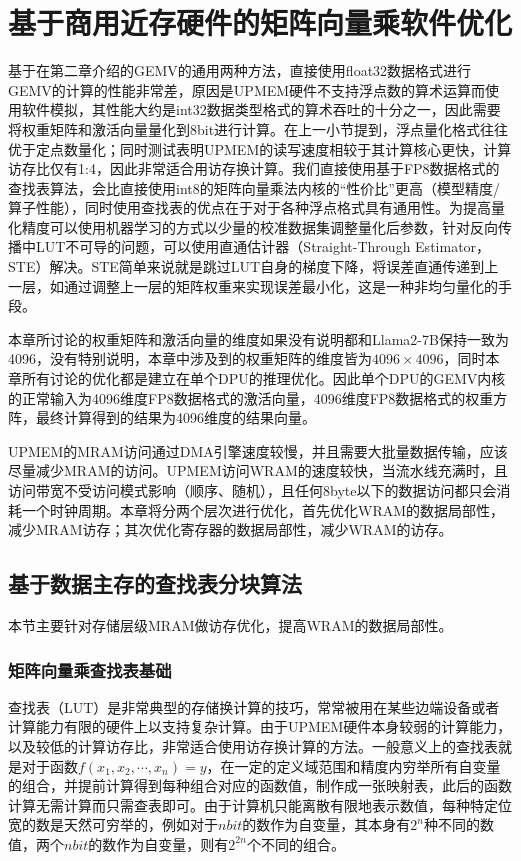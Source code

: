\chapter{基于商用近存硬件的矩阵向量乘软件优化}
基于在第二章介绍的GEMV的通用两种方法，直接使用float32数据格式进行GEMV的计算的性能非常差，原因是UPMEM硬件不支持浮点数的算术运算而使用软件模拟，其性能大约是int32数据类型格式的算术吞吐的十分之一\cite{BenchmarkingMutlu}，因此需要将权重矩阵和激活向量量化到8bit进行计算。在上一小节提到，浮点量化格式往往优于定点数量化\cite{ZeroQuantFP}；同时测试表明UPMEM的读写速度相较于其计算核心更快，计算访存比仅有1:4\cite{BenchmarkingMutlu}，因此非常适合用访存换计算。我们直接使用基于FP8数据格式\cite{FP8}的查找表算法，会比直接使用int8的矩阵向量乘法内核的“性价比”更高（模型精度/算子性能），同时使用查找表的优点在于对于各种浮点格式具有通用性。为提高量化精度可以使用机器学习的方式以少量的校准数据集调整量化后参数，针对反向传播中LUT不可导的问题，可以使用直通估计器（Straight-Through Estimator，STE）解决\cite{NonuniformQuant}。STE简单来说就是跳过LUT自身的梯度下降，将误差直通传递到上一层，如通过调整上一层的矩阵权重来实现误差最小化，这是一种非均匀量化的手段。

本章所讨论的权重矩阵和激活向量的维度如果没有说明都和Llama2-7B保持一致为4096，没有特别说明，本章中涉及到的权重矩阵的维度皆为$4096\times 4096$，同时本章所有讨论的优化都是建立在单个DPU的推理优化。因此单个DPU的GEMV内核的正常输入为4096维度FP8数据格式的激活向量，4096维度FP8数据格式的权重方阵，最终计算得到的结果为4096维度的结果向量。

UPMEM的MRAM访问通过DMA引擎速度较慢，并且需要大批量数据传输，应该尽量减少MRAM的访问。UPMEM访问WRAM的速度较快，当流水线充满时，且访问带宽不受访问模式影响（顺序、随机），且任何8byte以下的数据访问都只会消耗一个时钟周期。本章将分两个层次进行优化，首先优化WRAM的数据局部性，减少MRAM访存；其次优化寄存器的数据局部性，减少WRAM的访存。

\section{基于数据主存的查找表分块算法}
本节主要针对存储层级MRAM做访存优化，提高WRAM的数据局部性。

\subsection{矩阵向量乘查找表基础}
查找表（LUT）是非常典型的存储换计算的技巧，常常被用在某些边端设备或者计算能力有限的硬件上以支持复杂计算。由于UPMEM硬件本身较弱的计算能力，以及较低的计算访存比，非常适合使用访存换计算的方法。一般意义上的查找表就是对于函数$f(x_1,x_2,\cdots,x_n)=y$，在一定的定义域范围和精度内穷举所有自变量的组合，并提前计算得到每种组合对应的函数值，制作成一张映射表，此后的函数计算无需计算而只需查表即可。由于计算机只能离散有限地表示数值，每种特定位宽的数是天然可穷举的，例如对于$n bit$的数作为自变量，其本身有$2^n$种不同的数值，两个$n bit$的数作为自变量，则有$2^{2n}$个不同的组合。

